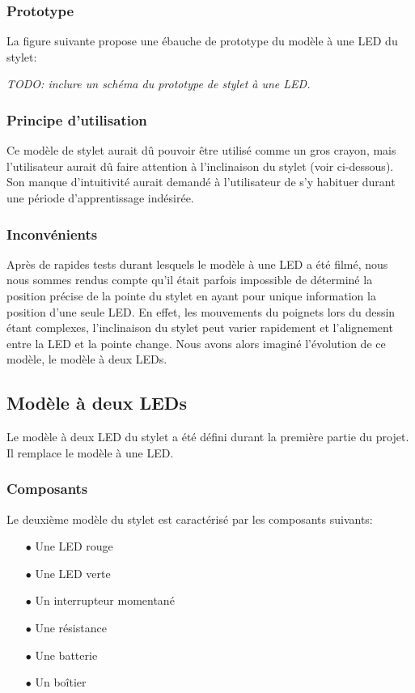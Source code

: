 \documentclass[11pt,a4paper,oldfontcommands]{memoir}
\begin{document}
\subsubsection{Prototype}

La figure suivante propose une ébauche de prototype du modèle à une LED du stylet:

\textit{TODO: inclure un schéma du prototype de stylet à une LED.}

\subsubsection{Principe d'utilisation}

Ce modèle de stylet aurait dû pouvoir être utilisé comme un gros crayon, mais l'utilisateur aurait dû faire attention à l'inclinaison du stylet (voir ci-dessous). Son manque d'intuitivité aurait demandé à l'utilisateur de s'y habituer durant une période d'apprentissage indésirée.

\subsubsection{Inconvénients}

Après de rapides tests durant lesquels le modèle à une LED a été filmé, nous nous sommes rendus compte qu'il était parfois impossible de déterminé la position précise de la pointe du stylet en ayant pour unique information la position d'une seule LED. En effet, les mouvements du poignets lors du dessin étant complexes, l'inclinaison du stylet peut varier rapidement et l'alignement entre la LED et la pointe change.
Nous avons alors imaginé l'évolution de ce modèle, le modèle à deux LEDs.

\newpage

\subsection{Modèle à deux LEDs}

Le modèle à deux LED du stylet a été défini durant la première partie du projet. Il remplace le modèle à une LED.

\subsubsection{Composants}

Le deuxième modèle du stylet est caractérisé par les composants suivants:

\begin{itemize}
\item[$\bullet$] Une LED rouge
\item[$\bullet$] Une LED verte
\item[$\bullet$] Un interrupteur momentané
\item[$\bullet$] Une résistance
\item[$\bullet$] Une batterie
\item[$\bullet$] Un boîtier
\end{itemize}
\end{document}
